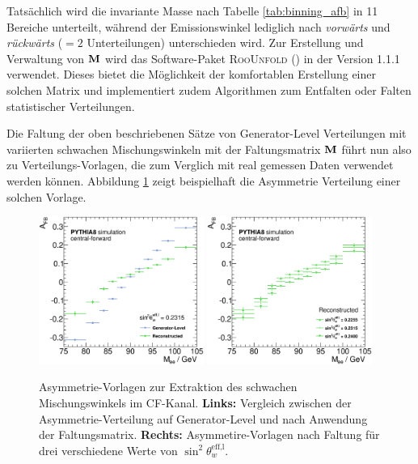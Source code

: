 Tatsächlich wird die invariante Masse nach Tabelle \ref{tab:binning_afb} in 11
Bereiche unterteilt, während der Emissionswinkel lediglich nach
\textit{vorwärts} und \textit{rückwärts} ($=2$ Unterteilungen) unterschieden
wird. Zur Erstellung und Verwaltung von $\bf{M}$ wird das Software-Paket
\textsc{RooUnfold} (\cite{2011arXiv1105.1160A}) in der Version 1.1.1 verwendet.
Dieses bietet die Möglichkeit der komfortablen Erstellung einer solchen Matrix
und implementiert zudem Algorithmen zum Entfalten oder Falten statistischer
Verteilungen.

Die Faltung der oben beschriebenen Sätze von Generator-Level Verteilungen mit
variierten schwachen Mischungswinkeln mit der Faltungsmatrix $\bf{M}$ führt nun
also zu Verteilungs-Vorlagen, die zum Verglich mit real gemessen Daten
verwendet werden können. Abbildung \ref{fig:vorlage} zeigt beispielhaft die
Asymmetrie Verteilung einer solchen Vorlage.

\begin{figure}
    \centering
    \includegraphics[width=0.48\textwidth]{plots/templates_cf_comp}
    \hfill
    \includegraphics[width=0.48\textwidth]{plots/templates_cf}
    \caption[Asymmetrie-Vorlagen zur Extraktion des schwachen Mischungswinkels]
        {Asymmetrie-Vorlagen zur Extraktion des schwachen Mischungswinkels im
        \ac{CF}-Kanal. \textbf{Links:} Vergleich zwischen der
        Asymmetrie-Verteilung auf Generator-Level und nach Anwendung der
        Faltungsmatrix. \textbf{Rechts:} Asymmetire-Vorlagen nach Faltung für
        drei verschiedene Werte von $\sin^2\theta_w^\text{eff,l}$.}
    \label{fig:vorlage}
\end{figure}

